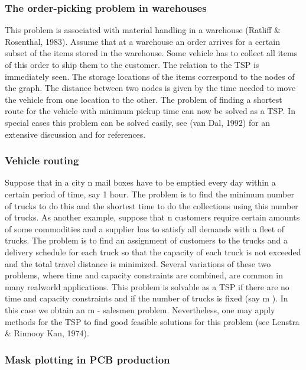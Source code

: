 \subsubsection{The order-picking problem in warehouses}
This problem is associated with material handling in a warehouse (Ratliff \& Rosenthal, 1983). Assume that at a warehouse an order arrives for a certain subset of the items stored in the warehouse. Some vehicle has to collect all items of this order to ship them to the customer. The relation to the TSP is immediately seen. The storage locations of the items correspond to the nodes of the graph. The distance between two nodes is given by the time needed to move the vehicle from one location to the other. The problem of finding a shortest route for the vehicle with minimum pickup time can now be solved as a TSP. In special cases this problem can be solved easily, see (van Dal, 1992) for an extensive discussion and for references.

\subsubsection{Vehicle routing}

Suppose that in a city n mail boxes have to be emptied every day within a certain period of time, say 1 hour. The problem is to find the minimum number of trucks to do this and the shortest time to do the collections using this number of trucks. As another example, suppose that n customers require certain amounts of some commodities and a supplier has to satisfy all demands with a fleet of trucks. The problem is to find an assignment of customers to the
trucks and a delivery schedule for each truck so that the capacity of each truck is not exceeded and the total travel distance is minimized. Several variations of these two problems, where time and capacity constraints are combined, are common in many realworld applications. This problem is solvable as a TSP if there are no time and capacity constraints and if the number of trucks is fixed (say m ). In this case we obtain an m - salesmen problem. Nevertheless, one may apply methods for the TSP to find good feasible
solutions for this problem (see Lenstra \& Rinnooy Kan, 1974).

\subsubsection{Mask plotting in PCB production}

